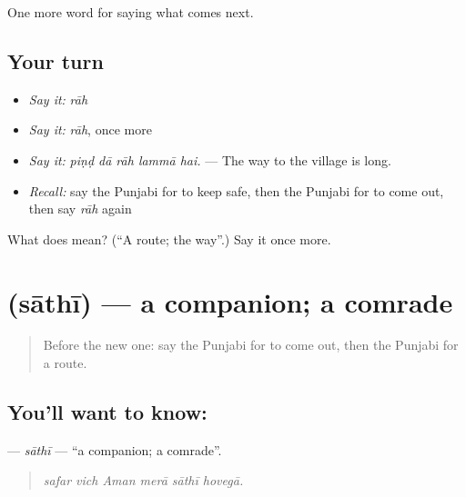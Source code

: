 \begin{grammarlens}[title={What you've built}]
One more word for saying what comes next.
\end{grammarlens}

\subsection*{Your turn}
\begin{itemize}
\raggedright
  \item \emph{Say it:} \emph{rāh}
  \item \emph{Say it:} \emph{rāh}, once more
  \item \emph{Say it:} \emph{piṇḍ dā rāh lammā hai.} — The way to the village is long.
  \item \emph{Recall:} say the Punjabi for to keep safe, then the Punjabi for to come out, then say \emph{rāh} again
\end{itemize}

\begin{tcolorbox}[breakable,colback=teal!4,colframe=teal!35!black,title={Before you move on}]
What does  mean? (\textquotedblleft{}A route; the way\textquotedblright{}.) Say it once more.
\end{tcolorbox}
\section[\texorpdfstring{\pa{ਸਾਥੀ} (sāthī)}{ਸਾਥੀ (sāthī)}]{ (sāthī) — a companion; a comrade}

\label{lesson:PA-C283-sathi}



\begin{quote}
Before the new one: say the Punjabi for to come out, then the Punjabi for a route.
\end{quote}

\subsection*{You'll want to know: }
\textbf{} — \emph{sāthī} — \textquotedblleft{}a companion; a comrade\textquotedblright{}.

\begin{quote}
     
\end{quote}

\begin{quote}
\emph{safar vich Aman merā sāthī hovegā.}
\end{quote}

